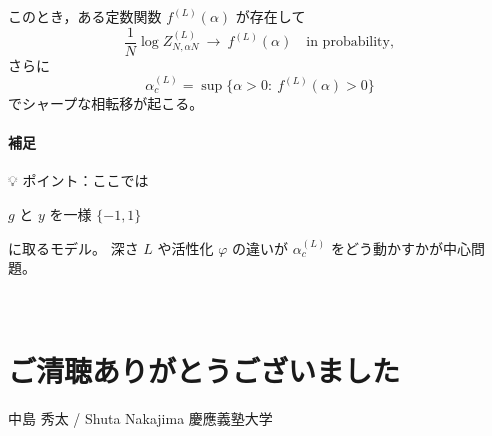 \documentclass[uplatex,dvipdfmx,11pt,a4paper,openany]{bxjsbook}
\begin{document}
      このとき，ある定数関数 \( f^{(L)}(\alpha) \) が存在して
      \[\frac{1}{N}\log Z_{N,\alpha N}^{(L)} \ \to\ f^{(L)}(\alpha)\quad \text{in probability},\]
      さらに
      \[\alpha_c^{(L)}=\sup\{\alpha>0:\ f^{(L)}(\alpha)>0\}\]
      でシャープな相転移が起こる。


\paragraph{補足}
💡 ポイント：ここでは

\( g \) と \( y \) を一様 \( \{-1,1\} \)

に取るモデル。 深さ \( L \) や活性化 \( \varphi \) の違いが \( \alpha_c^{(L)} \) をどう動かすかが中心問題。


🙏

\section{ご清聴ありがとうございました}
中島 秀太 / Shuta Nakajima\allowbreak{} 
慶應義塾大学


\fi
\backmatter
\end{document}
